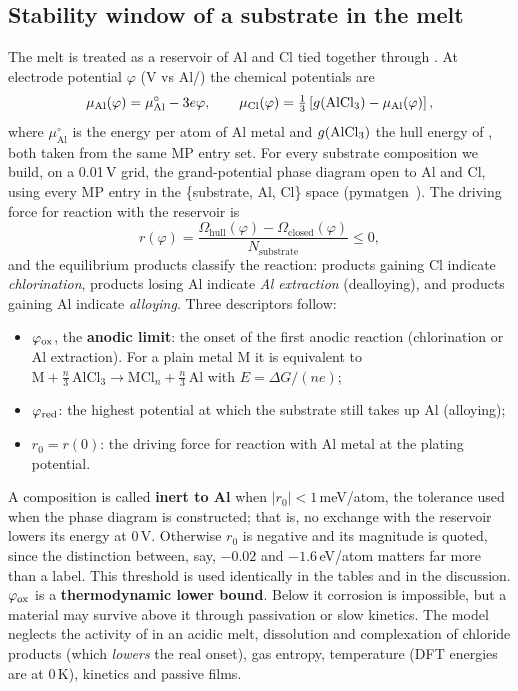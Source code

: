 \subsection{Stability window of a substrate in the melt}
\label{sec:window}
The melt is treated as a reservoir of Al and Cl tied together through . At electrode potential $\varphi$ (V vs Al/) the chemical potentials are
\begin{equation}
\mu_{\mathrm{Al}}(\varphi) = \mu^{\circ}_{\mathrm{Al}} - 3e\varphi, \qquad
\mu_{\mathrm{Cl}}(\varphi) = \tfrac{1}{3}\left[g(\ce{AlCl3}) - \mu_{\mathrm{Al}}(\varphi)\right],
\label{eq:mu}
\end{equation}
where $\mu^{\circ}_{\mathrm{Al}}$ is the energy per atom of Al metal and $g(\ce{AlCl3})$ the hull energy of , both taken from the same MP entry set. For every substrate composition we build, on a 0.01\,V grid, the grand-potential phase diagram open to Al and Cl, using every MP entry in the \{substrate, Al, Cl\} space (pymatgen~\citep{Ong2013}). The driving force for reaction with the reservoir is
\begin{equation}
r(\varphi) = \frac{\Omega_{\mathrm{hull}}(\varphi) - \Omega_{\mathrm{closed}}(\varphi)}{N_{\mathrm{substrate}}} \le 0 ,
\end{equation}
and the equilibrium products classify the reaction: products gaining Cl indicate \emph{chlorination}, products losing Al indicate \emph{Al extraction} (dealloying), and products gaining Al indicate \emph{alloying}. Three descriptors follow:
\begin{itemize}[leftmargin=*,itemsep=1pt]
\item $\varphi_{\mathrm{ox}}$, the \textbf{anodic limit}: the onset of the first anodic reaction (chlorination or Al extraction). For a plain metal M it is equivalent to $\mathrm{M} + \tfrac{n}{3}\,\mathrm{AlCl_3} \rightarrow \mathrm{MCl}_n + \tfrac{n}{3}\,\mathrm{Al}$ with $E = \Delta G/(ne)$;
\item $\varphi_{\mathrm{red}}$: the highest potential at which the substrate still takes up Al (alloying);
\item $r_0 = r(0)$: the driving force for reaction with Al metal at the plating potential.
\end{itemize}
A composition is called \textbf{inert to Al} when $|r_0| < 1$\,meV/atom, the tolerance used when the phase diagram is constructed; that is, no exchange with the reservoir lowers its energy at 0\,V. Otherwise $r_0$ is negative and its magnitude is quoted, since the distinction between, say, $-0.02$ and $-1.6$\,eV/atom matters far more than a label. This threshold is used identically in the tables and in the discussion.
$\varphi_{\mathrm{ox}}$ is a \textbf{thermodynamic lower bound}. Below it corrosion is impossible, but a material may survive above it through passivation or slow kinetics. The model neglects the activity of  in an acidic melt, dissolution and complexation of chloride products (which \emph{lowers} the real onset), gas entropy, temperature (DFT energies are at 0\,K), kinetics and passive films.

